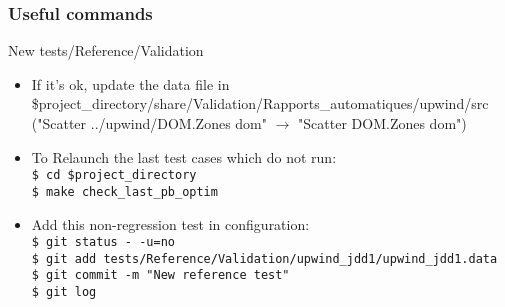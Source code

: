 \documentclass[10pt, hyperref={unicode=true,pdfusetitle, bookmarks=true,bookmarksnumbered=false,bookmarksopen=false, breaklinks=false,pdfborder={0 0 1},backref=true,colorlinks=true,linkcolor=darkblue,pageanchor, urlcolor=darkblue}]{beamer}
\begin{document}
\begin{frame}
\frametitle{Useful commands}
\begin{block}{New tests/Reference/Validation}

\begin{itemize}
\item If it's ok, update the data file in 
\$project\_directory/share/Validation/Rapports\_automatiques/upwind/src\\
("Scatter ../upwind/DOM.Zones dom" $\rightarrow$ "Scatter DOM.Zones dom")\\
\item To Relaunch the last test cases which do not run:\\
\texttt{\$ cd \$project\_directory}\\
\texttt{\$ make check\_last\_pb\_optim}\\
\item Add this non-regression test in configuration:\\
\texttt{\$ git status -\,-u=no}\\
\texttt{\$ git add tests/Reference/Validation/upwind\_jdd1/upwind\_jdd1.data}\\
\texttt{\$ git commit -m "New reference test"}\\
\texttt{\$ git log}\\
\end{itemize}

\end{block}
\end{frame}
\end{document}
